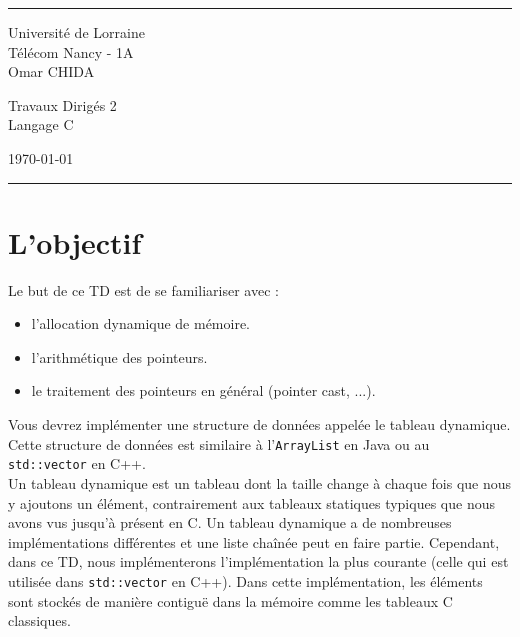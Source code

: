 \documentclass[a4paper]{article}
\begin{document}
	
	
	\fancyhead[C]{}
	\hrule \medskip %
	\begin{minipage}{0.295\textwidth} 
		\raggedright
		\footnotesize
		Université de Lorraine\hfill\\   
		Télécom Nancy - 1A\hfill\\
		Omar CHIDA
	\end{minipage}
	\begin{minipage}{0.4\textwidth} 
		\centering 
		\large 
		Travaux Dirigés 2\\ 
		\normalsize 
		Langage C\\ 
	\end{minipage}
	\begin{minipage}{0.295\textwidth} 
		\raggedleft
		\today\hfill\\
	\end{minipage}
	\medskip\hrule 
	\bigskip
	
	\section*{L'objectif}
	Le but de ce TD est de se familiariser avec :
	\begin{itemize}
		\item l'allocation dynamique de mémoire.
		\item l'arithmétique des pointeurs.
		\item le traitement des pointeurs en général (pointer cast, ...).
	\end{itemize}

	Vous devrez implémenter une structure de données appelée le tableau dynamique. Cette structure de données est similaire à l'\texttt{ArrayList} en Java ou au \texttt{std::vector} en C++. \\
	Un tableau dynamique est un tableau dont la taille change à chaque fois que nous y ajoutons un élément, contrairement aux tableaux statiques typiques que nous avons vus jusqu'à présent en C. Un tableau dynamique a de nombreuses implémentations différentes et une liste chaînée peut en faire partie. Cependant, dans ce TD, nous implémenterons l'implémentation la plus courante (celle qui est utilisée dans \texttt{std::vector} en C++). Dans cette implémentation, les éléments sont stockés de manière contiguë dans la mémoire comme les tableaux C classiques.
	
\end{document}
